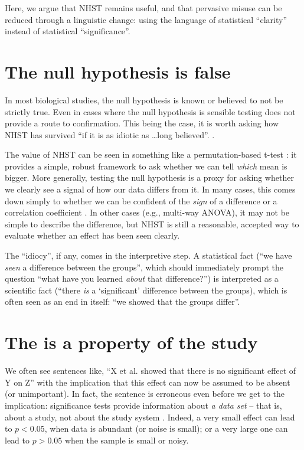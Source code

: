Here, we argue that NHST remains useful, and that pervasive misuse can be reduced through a linguistic change: using the language of statistical ``clarity'' instead of statistical ``significance''.

\section*{The null hypothesis is false}

In most biological studies, the null hypothesis is known or believed to not be strictly true.
Even in cases where the null hypothesis is sensible \citep[e.g., particle physics][]{Staley2017} \pval testing does not provide a route to confirmation.
This being the case, it is worth asking how NHST has survived ``if it is as idiotic as \ldots long believed''. 
\citet{Kramer2011}.

The value of NHST can be seen in something like a permutation-based t-test \cite[Chapter 1]{GoodBook}: it provides a simple, robust framework to ask whether we can tell \emph{which} mean is bigger. 
More generally, testing the null hypothesis is a proxy for asking whether we clearly see a signal of how our data differs from it.
In many cases, this comes down simply to whether we can be confident of the \emph{sign} of a difference or a correlation coefficient \citep{robinson2001past}. 
In other cases (e.g., multi-way ANOVA), it may not be simple to describe the difference, but NHST is still a reasonable, accepted way to evaluate whether an effect has been seen clearly.

The ``idiocy'', if any, comes in the interpretive step. A statistical fact (``we have \emph{seen} a difference between the groups'', which should immediately prompt the question ``what have you learned \emph{about} that difference?'') is interpreted as a scientific fact (``there \emph{is} a `significant' difference between the groups), which is often seen as an end in itself: ``we showed that the groups differ''.

\section*{The \pval is a property of the study}

We often see sentences like, ``X et al. showed that there is no significant effect of Y on Z'' with the implication that this effect can now be assumed to be absent (or unimportant). In fact, the sentence is erroneous even before we get to the implication: significance tests provide information about \emph{a data set} -- that is, about a study, not about the study system \citep{HoenigandHeisey2001}.
Indeed, a very small effect can lead to $p < 0.05$, when data is abundant (or noise is small); or a very large one can lead to $p > 0.05$ when the sample is small or noisy. 

